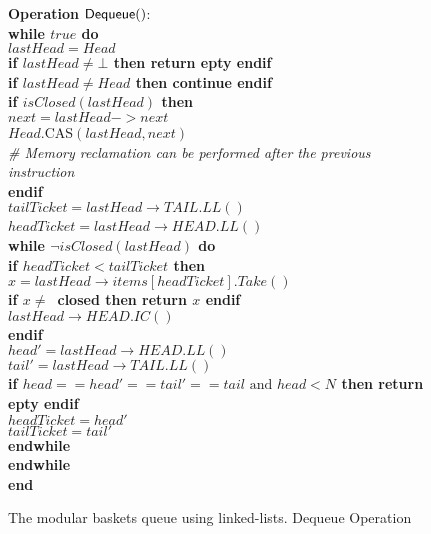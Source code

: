 \begin{figure}[H]
{{\begin{minipage}[t]{180mm}
\begin{tabbing}
{\bf Operation} ${\sf Dequeue}()$: \\
 \> {\bf while \(true\) do}\\
 \>\> \(lastHead = Head\) \\
 \>\> {\bf if \(lastHead \ne \bot\) then return epty endif}\\
 \>\> {\bf if \(lastHead \ne Head\) then continue endif}\\
 \>\> {\bf if \(isClosed(lastHead)\) then}\\
 \>\>\> {\bf \(next = lastHead->next\)} \\
 \>\>\> {\(Head.\)CAS\((lastHead, next)\)} \\
\>\>\> {\textit{\# Memory reclamation can be performed after the previous instruction}}\\
 \> \> {\bf endif} \\
 \>\> \(tailTicket = lastHead\rightarrow{}TAIL.LL()\) \\
 \>\> \(headTicket = lastHead\rightarrow{}HEAD.LL()\)\ \\
 \>\> {\bf while \(\neg isClosed(lastHead)\) do} \\
 \>\>\> {\bf if \(headTicket < tailTicket\) then} \\
 \>\>\>\> \(x = lastHead\rightarrow{}items[headTicket].Take()\) \\
 \>\>\>\> {\bf if \(x \ne \)\ closed then return \(x\) endif} \\
 \>\>\>\> \(lastHead\rightarrow{}HEAD.IC()\) \\
 \>\>\> {\bf endif} \\
 \>\>\> {$head' = lastHead\rightarrow{}HEAD.LL()$}\\
 \>\>\> {$tail' = lastHead\rightarrow{}TAIL.LL()$}\\
 \>\>\> {\bf if $head == head' == tail' == tail \text{ and } head < N$ then return epty endif}\\
 \>\>\> $headTicket = head'$ \\
 \>\>\> $tailTicket = tail'$\\
 \>\> {\bf endwhile} \\
 \> {\bf endwhile}\\
{\bf end \Deq}
\end{tabbing}
\end{minipage} }
\caption{\label{alg:basket-queue-linked-list-deq}The modular baskets queue using linked-lists. Dequeue Operation}
}
\end{figure}


